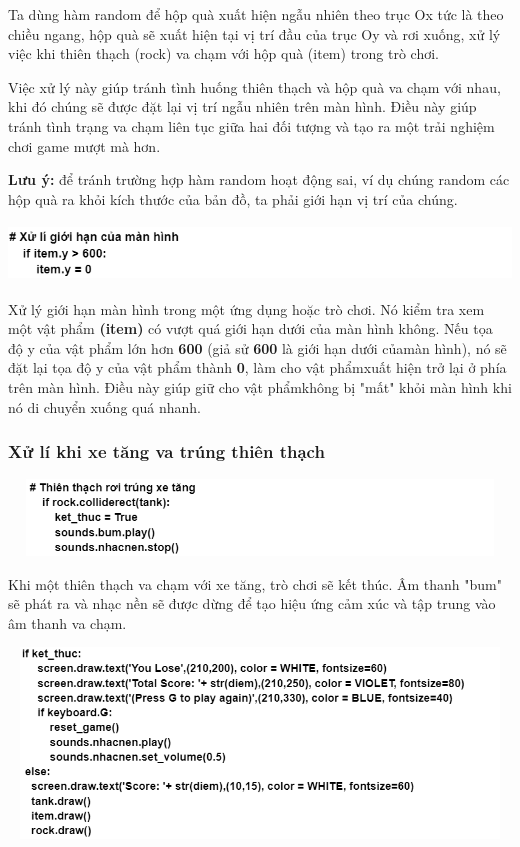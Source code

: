 \documentclass[a4paper]{article}
\begin{document}
Ta dùng hàm random để hộp quà xuất hiện ngẫu nhiên theo trục Ox tức là
theo chiều ngang, hộp quà sẽ xuất hiện tại vị trí đầu của trục Oy và rơi
xuống, xử lý việc khi thiên thạch (rock) va chạm với hộp quà (item)
trong trò chơi.

Việc xử lý này giúp tránh tình huống thiên thạch và hộp quà va chạm với
nhau, khi đó chúng sẽ được đặt lại vị trí ngẫu nhiên trên màn hình. Điều
này giúp tránh tình trạng va chạm liên tục giữa hai đối tượng và tạo ra
một trải nghiệm chơi game mượt mà hơn.

\textbf{Lưu ý:} để tránh trường hợp hàm random hoạt động sai, ví dụ
chúng random các hộp quà ra khỏi kích thước của bản đồ, ta phải giới hạn
vị trí của chúng.

\includegraphics[width=5.5in,height=0.6in]{image13_4.png}

Xử lý giới hạn màn hình trong một ứng dụng hoặc trò chơi. Nó kiểm tra
xem một vật phẩm \textbf{(item)} có vượt quá giới hạn dưới của màn hình không.
Nếu tọa độ y của vật phẩm lớn hơn \textbf{600} (giả sử \textbf{600} là giới hạn dưới củamàn hình), nó sẽ đặt lại tọa độ y của vật phẩm thành \textbf{0}, làm cho vật phẩmxuất hiện trở lại ở phía trên màn hình. Điều này giúp giữ cho vật phẩmkhông bị "mất" khỏi màn hình khi nó di chuyển xuống quá nhanh.
\subsubsection{Xử lí khi xe tăng va trúng thiên thạch}
\includegraphics[width=5.5in,height=0.8in]{image13_5.png}

Khi một thiên thạch va chạm với xe tăng, trò chơi sẽ kết thúc. Âm thanh
"bum" sẽ phát ra và nhạc nền sẽ được dừng để tạo hiệu ứng cảm xúc và tập
trung vào âm thanh va chạm.

\includegraphics[width=6in,height=2in]{image13_6.png}
\end{document}
